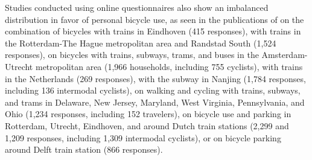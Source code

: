 \begin{refsegment}
Studies conducted using online questionnaires also show an imbalanced distribution in favor of personal bicycle use, as seen in the publications of \textcolor{blue}{\textcite[724]{waerden_relation_2018}} on the combination of bicycles with trains in Eindhoven (415 responses), \textcolor{blue}{\textcite[5, 488]{la_paix_puello_train_2016, la_paix_puello_role_2021}} with trains in the Rotterdam-The Hague metropolitan area and Randstad South (1,524 responses), \textcolor{blue}{\textcite[267]{krygsman_multimodal_2004}} on bicycles with trains, subways, trams, and buses in the Amsterdam-Utrecht metropolitan area (1,966 households, including 755 cyclists), \textcolor{blue}{\textcite[663]{mil_insights_2020}} with trains in the Netherlands (269 responses), \textcolor{blue}{\textcite[132-133]{chen_determinants_2012}} with the subway in Nanjing (1,784 responses, including 136 intermodal cyclists), \textcolor{blue}{\textcite[4259]{bopp_examining_2015}} on walking and cycling with trains, subways, and trams in Delaware, New Jersey, Maryland, West Virginia, Pennsylvania, and Ohio (1,234 responses, including 152 travelers), \textcolor{blue}{\textcite[6]{jonkeren_bicycle-train_2021, jonkeren_bicycle_2021}} on bicycle use and parking in Rotterdam, Utrecht, Eindhoven, and around Dutch train stations (2,299 and 1,209 responses, including 1,309 intermodal cyclists), or \textcolor{blue}{\textcite[6]{molin_bicycle_2015}} on bicycle parking around Delft train station (866 responses).%


\end{refsegment}
